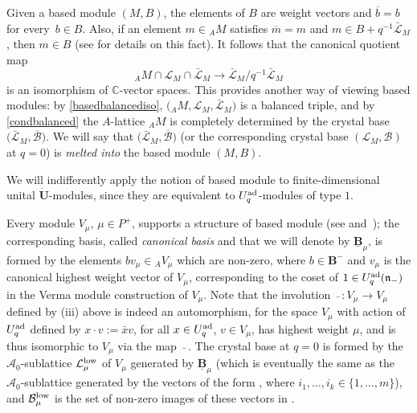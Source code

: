 \documentclass[pdftex]{sigma}
\numberwithin{equation}{section}
\theoremstyle{definition}
\newcommand{\mc}{\mathbb{C}}
\newcommand{\Ll}{{\mathcal L}}
\newcommand{\ra}{\rightarrow}
\begin{document}
Given a based module $(M,B)$, the elements of $B$ are weight vectors and $\overline{b}=b$ for every~${b\in B}$. Also, if an element $m\in {}_A M$ satisfies $\overline{m}=m$ and $m\in B + q^{-1}\bar{\Ll}_M$, then $m\in B$ (see \cite[Section~27.1.5]{Lusztig} for details on this fact). It follows that the canonical quotient map
\begin{equation}\label{basedbalancediso} {}_A M \cap \Ll_M \cap \bar{\Ll}_M \ra \bar{\Ll}_M/q^{-1}\bar{\Ll}_M
\end{equation}
is an isomorphism of $\mc$-vector spaces. This provides another way of viewing based modules: by \eqref{basedbalancediso}, $\big({}_A M, \Ll_M,\bar{\Ll}_M\big)$ is a balanced triple, and by \eqref{condbalanced} the $A$-lattice ${}_A M$ is completely determined by the crystal base $\big(\bar{\Ll}_M,\overline{\mathcal{B}}\big)$. We will say that $\big(\bar{\Ll}_M,\overline{\mathcal{B}}\big)$ (or the corresponding crystal base $(\Ll_M,\mathcal{B})$ at $q=0$) is {\it melted into} the based module $(M,B)$.

We will indifferently apply the notion of based module to finite-dimensional unital $\dot{\mathbf{U}}$-modules, since they are equivalent to $U_q^{\rm ad}$-modules of type $1$.


Every module $V_\mu$, $\mu\in P^+$, supports a structure of based module (see \cite[Section~14.4.10]{Lusztig} and~\cite{Kashiwara1}); the corresponding basis, called {\it canonical basis} and that we will denote by $\underline{\mathbf{B}}_{\mu}$, is formed by the elements $bv_{\mu}\in {}_AV_\mu$ which are non-zero, where $b\in \mathbf{B}^-$ and $v_{\mu}$ is the canonical highest weight vector of $V_{\mu}$, corresponding to the coset of $1\in U_q^{\rm ad}(\mathfrak{n}_-)$ in the Verma module construction of $V_{\mu}$. Note that the involution $\ \bar{}\ \colon V_{\mu}\ra V_{\mu}$ defined by (iii) above is indeed an automorphism, for the space $V_\mu$ with action of $U_q^{\rm ad}$ defined by $x\cdot v := \bar{x}v$, for all $x\in U_q^{\rm ad}$, $v\in V_\mu$, has highest weight $\mu$, and is thus isomorphic to $V_\mu$ via the map $\ \bar{}\ $. The crystal base \smash{$\big(\Ll_\mu^{\rm low},\mathcal{B}_\mu^{\rm low}\big)$} at $q=0$ is formed by the $\mathcal{A}_0$-sublattice $\Ll_\mu^{\rm low}$ of $V_{\mu}$ generated by $\underline{\mathbf{B}}_{\mu}$ (which is eventually the same as the $\mathcal{A}_0$-sublattice generated by the vectors of the form , where $i_1,\dots ,i_k \in \{1,\dots,m\}$), and $\mathcal{B}_\mu^{\rm low}$ is the set of non-zero images of these vectors in \smash{$\Ll_\mu^{\rm low}/q\Ll_\mu^{\rm low}$}.
\end{document}
